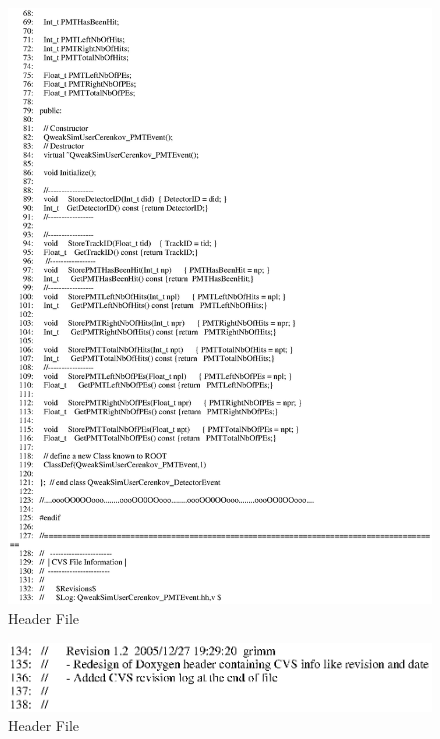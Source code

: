 \begin{figure}[ht]
  \hspace{0cm}
  \includegraphics[scale=0.8]{./figures5/QweakSimUserCerenkov_PMTEvent.hh-p2.eps}
  \caption{\label{SourceV41} Header File}
           \label{fig:V-SC-44}
\end{figure}

\clearpage

\begin{figure}[ht]
  \hspace{0cm}
  \includegraphics[scale=0.8]{./figures5/QweakSimUserCerenkov_PMTEvent.hh-p3.eps}
  \caption{\label{SourceV42} Header File}
           \label{fig:V-SC-45}
\end{figure}

